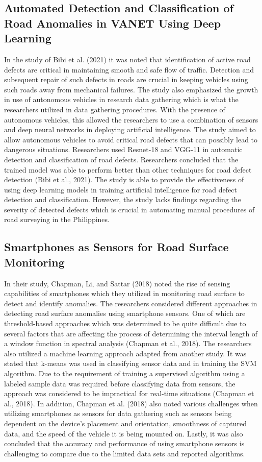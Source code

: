 \documentclass{report} %
\begin{document}
	\subsection{Automated Detection and Classification of Road Anomalies in VANET Using Deep Learning}
		In the study of Bibi et al. (2021) it was noted that identification of active road defects are critical in maintaining smooth and safe flow of traffic. Detection and subsequent repair of such defects in roads are crucial in keeping vehicles using such roads away from mechanical failures. The study also emphasized the growth in use of autonomous vehicles in research data gathering which is what the researchers utilized in data gathering procedures. With the presence of autonomous vehicles, this allowed the researchers to use a combination of sensors and deep neural networks in deploying artificial intelligence. The study aimed to allow autonomous vehicles to avoid critical road defects that can possibly lead to dangerous situations. Researchers used Resnet-18 and VGG-11 in automatic detection and classification of road defects. Researchers concluded that the trained model was able to perform better than other techniques for road defect detection (Bibi et al., 2021). The study is able to provide the effectiveness of using deep learning models in training artificial intelligence for road defect detection and classification. However, the study lacks findings regarding the severity of detected defects which is crucial in automating manual procedures of road surveying in the Philippines.
	
	\subsection{Smartphones as Sensors for Road Surface Monitoring}
		In their study, Chapman, Li, and Sattar (2018) noted the rise of sensing capabilities of smartphones which they utilized in monitoring road surface to detect and identify anomalies. The researchers considered different approaches in detecting road surface anomalies using smartphone sensors. One of which are threshold-based approaches which was determined to be quite difficult  due to several factors that are affecting the process of determining the interval length of a window function in spectral analysis (Chapman et al., 2018). The researchers also utilized a machine learning approach adapted from another study. It was stated that k-means was used in classifying sensor data and in training the SVM algorithm. Due to the requirement of training a supervised algorithm using a labeled sample data was required before classifying data from sensors, the approach was considered to be impractical for real-time situations (Chapman et al., 2018). In addition, Chapman et al. (2018) also noted various challenges when utilizing smartphones as sensors for data gathering such as sensors being dependent on the device’s placement and orientation, smoothness of captured data, and the speed of the vehicle it is being mounted on. Lastly, it was also concluded that the accuracy and performance of using smartphone sensors is challenging to compare due to the limited data sets and reported algorithms.
\end{document}
